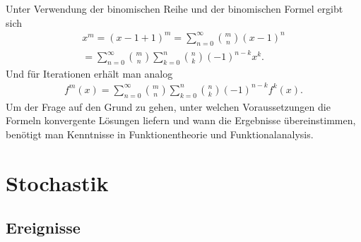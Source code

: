 \documentclass[a4paper,10pt,fleqn,twocolumn,twoside]{article}
\numberwithin{equation}{section}
\begin{document}
Unter Verwendung der binomischen Reihe und der binomischen Formel
ergibt sich
\begin{gather*}
x^m = (x-1+1)^m = \sum_{n=0}^\infty \binom{m}{n}(x-1)^n\\
= \sum_{n=0}^\infty \binom{m}{n}\sum_{k=0}^n\binom{n}{k}(-1)^{n-k}x^k.
\end{gather*}
Und für Iterationen erhält man analog
\begin{gather*}
f^m(x) = \sum_{n=0}^\infty \binom{m}{n}
\sum_{k=0}^n\binom{n}{k}(-1)^{n-k}f^k(x).
\end{gather*}
Um der Frage auf den Grund zu gehen, unter welchen Voraussetzungen
die Formeln konvergente Lösungen liefern und wann die Ergebnisse
übereinstimmen, benötigt man Kenntnisse in Funktionentheorie
und Funktionalanalysis.


\newpage
\section{Stochastik}
\subsection{Ereignisse}
\end{document}
